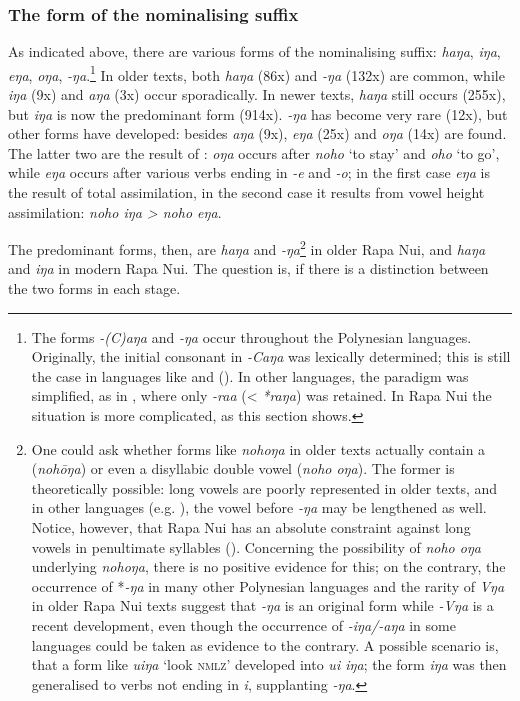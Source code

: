 \subsubsection[The form of the nominalising suffix]{The form of the nominalising suffix}\label{sec:3.2.3.2}
As indicated above, there are various forms of the nominalising suffix: \textit{haŋa}, \textit{iŋa}, \textit{eŋa}, \textit{oŋa}, \textit{-ŋa}.\footnote{\label{fn:110}The forms \textit{-(C)aŋa} and \textit{-ŋa} occur throughout the Polynesian languages. Originally, the initial consonant in \textit{-Caŋa} was lexically determined; this is still the case in languages like  \citep[512]{Bauer1993} and  (\citealt[194]{MoselHovdhaugen1992}). In other languages, the paradigm was simplified, as in , where only \textit{-ra{\ꞌ}a} ({\textless} \textit{*raŋa}) was retained. In Rapa Nui the situation is more complicated, as this section shows.} In older texts, both \textit{haŋa} (86x) and \textit{-ŋa} (132x) are common, while \textit{iŋa} (9x) and \textit{aŋa} (3x) occur sporadically. In newer texts, \textit{haŋa} still occurs (255x), but \textit{iŋa} is now the predominant form (914x). \textit{-ŋa} has become very rare (12x), but other forms have developed: besides \textit{aŋa} (9x), \textit{eŋa} (25x) and \textit{oŋa} (14x) are found. The latter two are the result of : \textit{oŋa} occurs after \textit{noho} ‘to stay’ and \textit{oho} ‘to go’, while \textit{eŋa} occurs after various verbs ending in \textit{-e} and \textit{-o}; in the first case \textit{eŋa} is the result of total assimilation, in the second case it results from vowel height assimilation: \textit{noho iŋa {\textgreater} noho eŋa}. 

The predominant forms, then, are \textit{haŋa} and \textit{-ŋa}\footnote{\label{fn:111}One could ask whether forms like \textit{nohoŋa} in older texts actually contain a  (\textit{nohōŋa}) or even a disyllabic double vowel (\textit{noho oŋa}). The former is theoretically possible: long vowels are poorly represented in older texts, and in other languages (e.g. ), the vowel before \textit{-ŋa} may be lengthened as well. Notice, however, that Rapa Nui has an absolute constraint against long vowels in penultimate syllables (). Concerning the possibility of \textit{noho oŋa} underlying \textit{nohoŋa}, there is no positive evidence for this; on the contrary, the occurrence of *\textit{-ŋa} in many other Polynesian languages and the rarity of \textit{Vŋa} in older Rapa Nui texts suggest that \textit{-ŋa} is an original form while \textit{-Vŋa} is a recent development, even though the occurrence of \textit{-iŋa/-aŋa} in some languages could be taken as evidence to the contrary. A possible scenario is, that a form like \textit{u{\ꞌ}iŋa} ‘look \textsc{nmlz}’ developed into \textit{u{\ꞌ}i iŋa}; the form \textit{iŋa} was then generalised to verbs not ending in \textit{i}, supplanting \textit{-ŋa}.} in older Rapa Nui, and \textit{haŋa} and \textit{iŋa} in modern Rapa Nui. The question is, if there is a distinction between the two forms in each stage.

